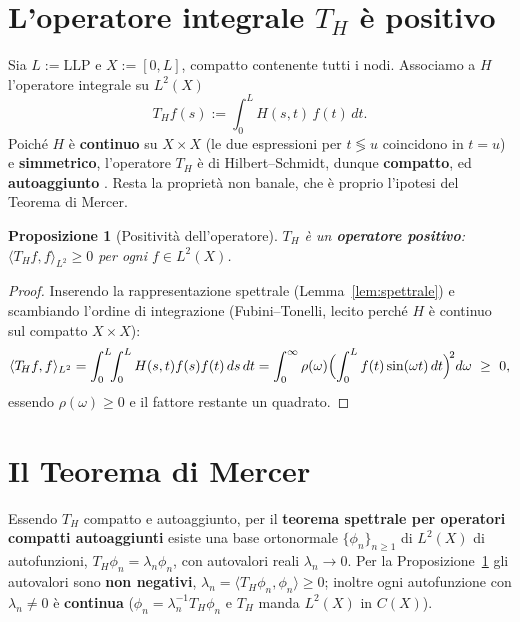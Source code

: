\documentclass[11pt,a4paper]{article}
\theoremstyle{plain}
\newtheorem{proposizione}[teorema]{Proposizione}
\theoremstyle{remark}
\newcommand{\LLP}{\mathrm{LLP}}
\newcommand{\Top}{T_{\!H}}
\newcommand{\inner}[2]{\langle #1, #2\rangle}
\begin{document}
\section{L'operatore integrale \texorpdfstring{$\Top$}{T\_H} \`e positivo}
\label{sec:operatore}

Sia $L:=\LLP$ e $X:=[0,L]$, compatto contenente tutti i nodi. Associamo a $H$ l'operatore
integrale su $L^2(X)$
\[
  \Top f(s):=\int_0^L H(s,t)\,f(t)\,dt .
\]
Poich\'e $H$ \`e \textbf{continuo} su $X\times X$ (le due espressioni per $t\lessgtr u$ coincidono
in $t=u$) e \textbf{simmetrico}, l'operatore $\Top$ \`e di Hilbert--Schmidt, dunque
\textbf{compatto}, ed \textbf{autoaggiunto} \cite{reedsimon1980,brezis2011}. Resta la propriet\`a
non banale, che \`e proprio l'ipotesi del Teorema di Mercer.

\begin{proposizione}[Positivit\`a dell'operatore]
\label{prop:positivo}
$\Top$ \`e un \textbf{operatore positivo}: $\inner{\Top f}{f}_{L^2}\ge0$ per ogni $f\in L^2(X)$.
\end{proposizione}
\begin{proof}
Inserendo la rappresentazione spettrale (Lemma~\ref{lem:spettrale}) e scambiando l'ordine di
integrazione (Fubini--Tonelli, lecito perch\'e $H$ \`e continuo sul compatto $X\times X$):
\[
  \inner{\Top f}{f}_{L^2}
  = \int_0^L\!\!\int_0^L H(s,t)f(s)f(t)\,ds\,dt
  = \int_0^\infty \rho(\omega)\Bigl(\int_0^L f(t)\sin(\omega t)\,dt\Bigr)^{\!2} d\omega\ \ge\ 0,
\]
essendo $\rho(\omega)\ge0$ e il fattore restante un quadrato.
\end{proof}

\section{Il Teorema di Mercer}
\label{sec:mercer}

Essendo $\Top$ compatto e autoaggiunto, per il \textbf{teorema spettrale per operatori compatti
autoaggiunti} \cite{reedsimon1980,brezis2011} esiste una base ortonormale $\{\phi_n\}_{n\ge1}$ di
$L^2(X)$ di autofunzioni, $\Top\phi_n=\lambda_n\phi_n$, con autovalori reali $\lambda_n\to0$. Per
la Proposizione~\ref{prop:positivo} gli autovalori sono \textbf{non negativi},
$\lambda_n=\inner{\Top\phi_n}{\phi_n}\ge0$; inoltre ogni autofunzione con $\lambda_n\ne0$ \`e
\textbf{continua} ($\phi_n=\lambda_n^{-1}\Top\phi_n$ e $\Top$ manda $L^2(X)$ in $C(X)$).
\end{document}
